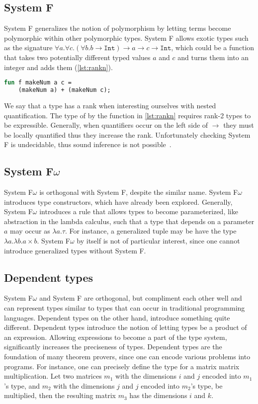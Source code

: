 \subsection{System F}
System F generalizes the notion of polymorphism by letting terms become polymorphic within other polymorphic types.
System F allows exotic types such as the signature $\forall a.\forall c.(\forall b.b \rightarrow \texttt{Int}) \rightarrow a \rightarrow c \rightarrow \texttt{Int}$, which could be a function that takes two potentially different typed values $a$ and $c$ and turns them into an integer and adds them (\autoref{lst:rankn}).
\begin{lstlisting}[language=ML,caption={Rank 2 type in System F},label={lst:rankn},mathescape=true]
fun f makeNum a c =
    (makeNum a) + (makeNum c);
\end{lstlisting}
We say that a type has a rank when interesting ourselves with nested quantification.
The type of by the function in \autoref{lst:rankn} requires rank-2 types to be expressible.
Generally, when quantifiers occur on the left side of $\rightarrow$ they must be locally quantified thus they increase the rank.
Unfortunately checking System F is undecidable, thus sound inference is not possible~\cite{wells1999typability}.

\subsection{System F\underline{$\omega$}}
System F\underline{$\omega$} is orthogonal with System F, despite the similar name.
System F\underline{$\omega$} introduces type constructors, which have already been explored.
Generally, System F\underline{$\omega$} introduces a rule that allows types to become parameterized, like abstraction in the lambda calculus, such that a type that depends on a parameter $a$ may occur as $\lambda a.\tau$.
For instance, a generalized tuple may be have the type $\lambda a.\lambda b.a \times b$.
System F\underline{$\omega$} by itself is not of particular interest, since one cannot introduce generalized types without System F.

\subsection{Dependent types}
System F\underline{$\omega$} and System F are orthogonal, but compliment each other well and can represent types similar to types that can occur in traditional programming languages.
Dependent types on the other hand, introduce something quite different.
Dependent types introduce the notion of letting types be a product of an expression.
Allowing expressions to become a part of the type system, significantly increases the preciseness of types.
Dependent types are the foundation of many theorem provers, since one can encode various problems into programs.
For instance, one can precisely define the type for a matrix matrix multiplication.
Let two matrices $m_1$ with the dimensions $i$ and $j$ encoded into $m_1$'s type, and $m_2$ with the dimensions $j$ and $j$ encoded into $m_2$'s type, be multiplied, then the resulting matrix $m_3$ has the dimensions $i$ and $k$.

